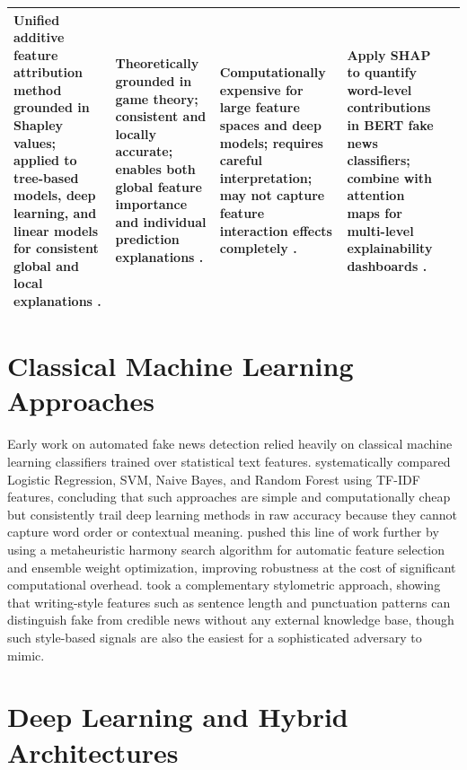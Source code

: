 \begin{longtable}{|p{}|p{}|p{}|p{}|p{}|}
Unified additive feature attribution method grounded in Shapley values; applied to tree-based models, deep learning, and linear models for consistent global and local explanations \cite{Lundberg2017SHAP}. &
Theoretically grounded in game theory; consistent and locally accurate; enables both global feature importance and individual prediction explanations \cite{Lundberg2017SHAP}. &
Computationally expensive for large feature spaces and deep models; requires careful interpretation; may not capture feature interaction effects completely \cite{Lundberg2017SHAP}. &
Apply SHAP to quantify word-level contributions in BERT fake news classifiers; combine with attention maps for multi-level explainability dashboards \cite{Lundberg2017SHAP}. \\ \hline
\end{longtable}

\section{Classical Machine Learning Approaches}

Early work on automated fake news detection relied heavily on classical machine learning classifiers trained over statistical text features. \citet{Aphiwongsophon2021Detecting} systematically compared Logistic Regression, SVM, Naive Bayes, and Random Forest using TF-IDF features, concluding that such approaches are simple and computationally cheap but consistently trail deep learning methods in raw accuracy because they cannot capture word order or contextual meaning. \citet{Huang2020FakeNews} pushed this line of work further by using a metaheuristic harmony search algorithm for automatic feature selection and ensemble weight optimization, improving robustness at the cost of significant computational overhead. \citet{Przybyla2020Capturing} took a complementary stylometric approach, showing that writing-style features such as sentence length and punctuation patterns can distinguish fake from credible news without any external knowledge base, though such style-based signals are also the easiest for a sophisticated adversary to mimic.

\section{Deep Learning and Hybrid Architectures}

